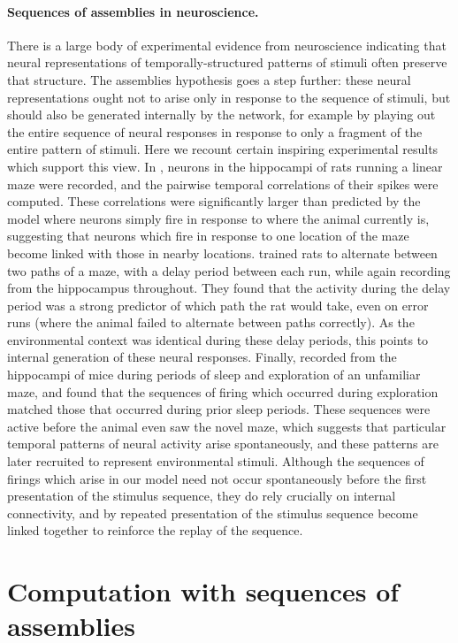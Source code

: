 \documentclass[12pt,nosubfloats]{alt2024} %
\newcommand{\1}{\mathbbm{1}}
\begin{document}
\paragraph{Sequences of assemblies in neuroscience.} There is a large body of experimental evidence from neuroscience indicating that neural representations of temporally-structured patterns of stimuli often preserve that structure. The assemblies hypothesis goes a step further: these neural representations ought not to arise only in response to the sequence of stimuli, but should also be generated internally by the network, for example by playing out the entire sequence of neural responses in response to only a fragment of the entire pattern of stimuli. Here we recount certain inspiring experimental results which support this view. In \citet{dragoi2006temporal}, neurons in the hippocampi of rats running a linear maze were recorded, and the pairwise temporal correlations of their spikes were computed. These correlations were significantly larger than predicted by the model where neurons simply fire in response to where the animal currently is, suggesting that neurons which fire in response to one location of the maze become linked with those in nearby locations. \citet{pastalkova2008internally} trained rats to alternate between two paths of a maze, with a delay period between each run, while again recording from the hippocampus throughout. They found that the activity during the delay period was a strong predictor of which path the rat would take, even on error runs (where the animal failed to alternate between paths correctly). As the environmental context was identical during these delay periods, this points to internal generation of these neural responses. Finally, \citet{dragoi2011preplay} recorded from the hippocampi of mice during periods of sleep and exploration of an unfamiliar maze, and found that the sequences of firing which occurred during exploration matched those that occurred during prior sleep periods. These sequences were active before the animal even saw the novel maze, which suggests that particular temporal patterns of neural activity arise spontaneously, and these patterns are later recruited to represent environmental stimuli. Although the sequences of firings which arise in our model need not occur spontaneously before the first presentation of the stimulus sequence, they do rely crucially on internal connectivity, and by repeated presentation of the stimulus sequence become linked together to reinforce the replay of the sequence.

\section{Computation with sequences of assemblies}
\end{document}
